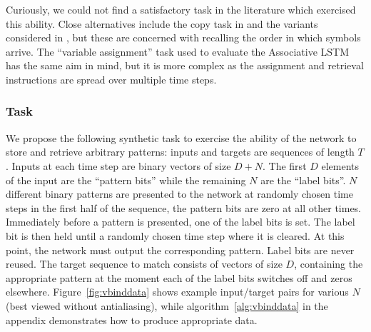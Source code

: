 Curiously, we could
not find a satisfactory task in the literature which exercised this ability.
Close alternatives include
the copy task in \autocite{Hochreiter1997} and the variants considered in \autocite{Graves2014}, but these
are concerned with recalling the order in which symbols arrive. The ``variable assignment'' task
used to evaluate the Associative LSTM \autocite{Danihelka2016} has the same aim in mind, but it is more
complex as the assignment and retrieval instructions are spread over multiple time steps.


\subsubsection{Task}
We propose the following synthetic task to exercise the ability of the network to store and retrieve
arbitrary patterns: inputs and targets are sequences of length \(T\). Inputs at each time step are
binary vectors of size \(D+N\). The first \(D\) elements of the input are the ``pattern bits'' while
the remaining \(N\) are the ``label bits''. \(N\) different binary patterns are presented to the
network at randomly chosen time steps in the first half of the sequence, the pattern bits are zero at
all other times. Immediately before a pattern is presented, one of the label bits is set. The label
bit is then held until a randomly chosen time step where it is cleared.
At this point, the network must output the corresponding pattern. Label bits are never reused. The target
sequence to match consists of vectors of size \(D\), containing the appropriate pattern at the moment each
of the label bits switches off and zeros elsewhere. Figure~\ref{fig:vbinddata} shows example input/target
pairs for various \(N\) (best viewed without antialiasing), 
while algorithm~\ref{alg:vbinddata} in the appendix demonstrates how to produce appropriate data.

